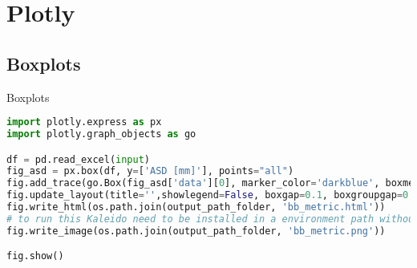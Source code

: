 

\chapter{Plotly}
\label{sec: plotly}

\section{Boxplots}
Boxplots


\begin{lstlisting}[language=Python, caption=Python example]
import plotly.express as px
import plotly.graph_objects as go

df = pd.read_excel(input)
fig_asd = px.box(df, y=['ASD [mm]'], points="all")
fig.add_trace(go.Box(fig_asd['data'][0], marker_color='darkblue', boxmean=True))
fig.update_layout(title='',showlegend=False, boxgap=0.1, boxgroupgap=0.5, font=dict(size=25))
fig.write_html(os.path.join(output_path_folder, 'bb_metric.html'))
# to run this Kaleido need to be installed in a environment path without any accent
fig.write_image(os.path.join(output_path_folder, 'bb_metric.png')) 

fig.show()

\end{lstlisting}